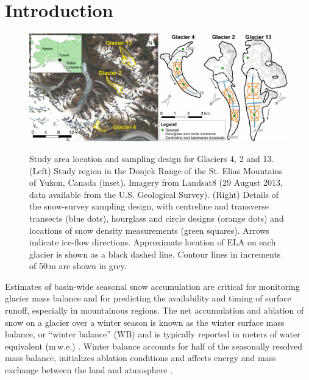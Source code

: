\documentclass[twocolumn,letterpaper]{igs}
\begin{document}
\maketitle

\section{Introduction}

\begin{figure}
	\centering
	\includegraphics[width =\textwidth]{PaperII-StudySite.pdf}\\
	\caption{Study area location and sampling design for Glaciers 4, 2 and 13. (Left) Study region in the Donjek Range of the St. Elias Mountains of Yukon, Canada (inset). Imagery from Landsat8 (29 August 2013, data available from the U.S. Geological Survey). (Right) Details of the snow-survey sampling design, with centreline and transverse transects (blue dots), hourglass and circle designs (orange dots) and locations of snow density measurements (green squares). Arrows indicate ice-flow directions. Approximate location of ELA on each glacier is shown as a black dashed line. Contour lines in increments of 50\,m are shown in grey.}
	\label{fig:Sampling}
\end{figure} 

Estimates of basin-wide seasonal snow accumulation are critical for monitoring glacier mass balance and for predicting the availability and timing of surface runoff, especially in mountainous regions. The net accumulation and ablation of snow on a glacier over a winter season is known as the winter surface mass balance, or ``winter balance'' (WB) and is typically reported in meters of water equivalent (m\,w.e.) \citep{Cogley2011}. Winter balance accounts for half of the seasonally resolved mass balance, initializes ablation conditions and affects energy and mass exchange between the land and atmosphere \citep[e.g.][]{Hock2005, Reveillet2016}. 
\end{document}
